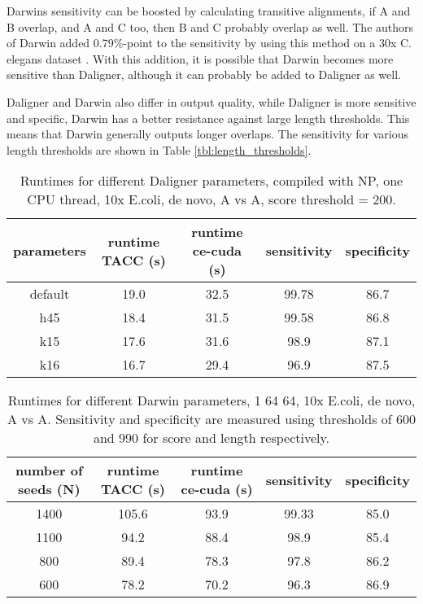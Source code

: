 \documentclass[../thesis.tex]{subfiles}
\begin{document}
Darwins sensitivity can be boosted by calculating transitive alignments, if A and B overlap, and A and C too, then B and C probably overlap as well.
The authors of Darwin added 0.79\%-point to the sensitivity by using this method on a 30x C. elegans dataset \cite{Darwin1}.
With this addition, it is possible that Darwin becomes more sensitive than Daligner, although it can probably be added to Daligner as well.

Daligner and Darwin also differ in output quality, while Daligner is more sensitive and specific, Darwin has a better resistance against large length thresholds.
This means that Darwin generally outputs longer overlaps.
The sensitivity for various length thresholds are shown in Table \ref{tbl:length_thresholds}.

\begin{table}
\centering
\caption{Runtimes for different Daligner parameters, compiled with NP, one CPU thread, 10x E.coli, de novo, A vs A, score threshold = 200.}
\label{tbl:daligner5}
\begin{tabular}{c|c c c c}
parameters & runtime TACC (s) & runtime ce-cuda (s) & sensitivity & specificity \\ \hline
default & 19.0 & 32.5 & 99.78 & 86.7 \\
h45     & 18.4 & 31.5 & 99.58 & 86.8 \\
k15     & 17.6 & 31.6 & 98.9 & 87.1 \\
k16     & 16.7 & 29.4 & 96.9 & 87.5 \\
\end{tabular}
\end{table}

\begin{table}
\centering
\caption{Runtimes for different Darwin parameters, 1 64 64, 10x E.coli, de novo, A vs A. Sensitivity and specificity are measured using thresholds of 600 and 990 for score and length respectively.}
\label{tbl:darwin4}
\begin{tabular}{c|c c c c}
number of seeds (N) & runtime TACC (s) & runtime ce-cuda (s) & sensitivity & specificity \\ \hline
1400 & 105.6 & 93.9 & 99.33 & 85.0 \\
1100 &  94.2 & 88.4 &  98.9 & 85.4 \\
 800 &  89.4 & 78.3 &  97.8 & 86.2 \\
 600 &  78.2 & 70.2 &  96.3 & 86.9 \\
\end{tabular}
\end{table}
\end{document}
